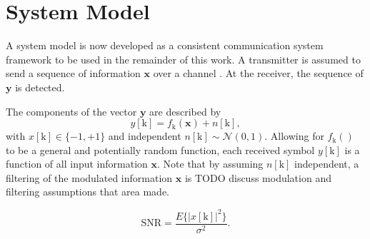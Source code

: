 \documentclass[12pt,a4paper]{report}
\begin{document}



\par

\section{System Model}

A system model is now developed as a consistent communication system framework to be used in the remainder of this work.
A transmitter is assumed to send a sequence of information $\mathbf{x}$ over a channel . At the receiver, the sequence of $\mathbf{y}$ is detected. 

\begin{figure}[H]
\end{figure}

The components of the vector $\mathbf{y}$ are described by 
\begin{equation*}
y[\text{k}] = f_{\text{k}}(\mathbf{x}) + n[\text{k}],
\end{equation*}
with $x[\text{k}] \in \{ -1, +1\}$ and independent $n[\text{k}]\sim \mathcal{N}(0,1).$
Allowing for $f_{\text{k}}()$ to be a general and potentially random function, each received symbol $y[\text{k}]$ is a function of all input information $\mathbf{x}$.
Note that by assuming $n[\text{k}]$ independent, a filtering of the modulated information $\mathbf{x}$ is 
TODO discuss modulation and filtering assumptions that area made. 


\begin{equation*}
\text{SNR} = \frac{E\{|x[\text{k}]|^2\}}{\sigma^2}.
\end{equation*}
\end{document}
